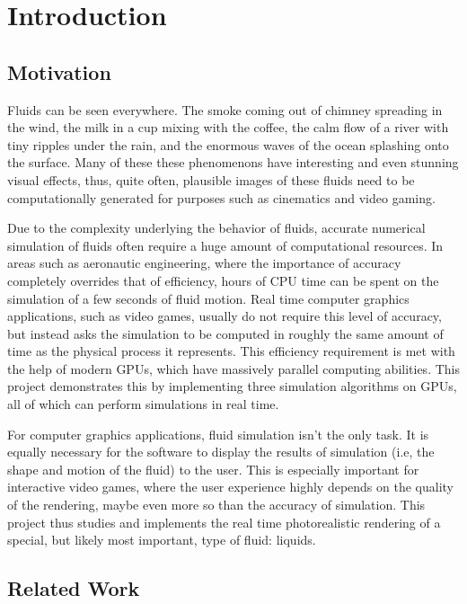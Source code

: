 \chapter{Introduction}

\section{Motivation}
Fluids can be seen everywhere. The smoke coming out of chimney spreading in the wind, the milk in a cup mixing with the coffee, the calm flow of a river with tiny ripples under the rain, and the enormous waves of the ocean splashing onto the surface. Many of these these phenomenons have interesting and even stunning visual effects, thus, quite often, plausible images of these fluids need to be computationally generated for purposes such as cinematics and video gaming. 

Due to the complexity underlying the behavior of fluids, accurate numerical simulation of fluids often require a huge amount of computational resources. In areas such as aeronautic engineering, where the importance of accuracy completely overrides that of efficiency, hours of CPU time can be spent on the simulation of a few seconds of fluid motion. Real time computer graphics applications, such as video games, usually do not require this level of accuracy, but instead asks the simulation to be computed in roughly the same amount of time as the physical process it represents. This efficiency requirement is met with the help of modern GPUs, which have massively parallel computing abilities. This project demonstrates this by implementing three simulation algorithms on GPUs, all of which can perform simulations in real time.

For computer graphics applications, fluid simulation isn't the only task. It is equally necessary for the software to display the results of simulation (i.e, the shape and motion of the fluid) to the user. This is especially important for interactive video games, where the user experience highly depends on the quality of the rendering, maybe even more so than the accuracy of simulation. This project thus studies and implements the real time photorealistic rendering of a special, but likely most important, type of fluid: liquids. 




\section{Related Work}



